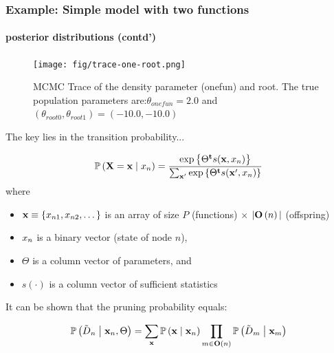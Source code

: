 \documentclass[aspectratio=169,9pt,handout]{beamer}
\begin{document}
\begin{frame}[c]
	\frametitle{Example: Simple model with two functions}
	\framesubtitle{posterior distributions (contd')}
	\begin{figure}
		\texttt{[image: fig/trace-one-root.png]}
		\caption{MCMC Trace of the density parameter (onefun) and root. The true population parameters are:\linebreak $\theta_{onefun} = 2.0$ and $(\theta_{root0}, \theta_{root1}) = (-10.0, -10.0)$}
	\end{figure}
\end{frame}


\begin{frame}
	
	\large The key lies in the \alert{transition probability}...\normalsize
	
	\begin{equation}
		\Prcond{\Ann=\mathbf{x}}{\ann{n}} = \frac{\exp{\t{\Theta} s(\mathbf{x},\ann{n})}}{\sum_{\mathbf{x}'}\exp{\t{\Theta} s(\mathbf{x}', \ann{n})}}
	\end{equation}
	where
	
	\begin{itemize}
	\item $\mathbf{x} \equiv \{x_{n1}{}, x_{n2}{},\dots\}$ is an array of size $P$ (functions) $\times$ $|\mathbf{O}\left(n\right)|$ (offspring)
	\item $x_{n}{}$ is a binary vector (state of node $n$),
	\item $\Theta$ is a column vector of parameters, and
	\item $s(\cdot)$ is a column vector of sufficient statistics 
	\end{itemize}

It can be shown that the \alert{pruning} probability equals:
	
\begin{equation}
	\Prcond{\aphyloObs_n}{\mathbf{x}_{n}, \Theta} = %
	\sum_{\mathbf{x}}\Prcond{\mathbf{x}}{\mathbf{x}_{n}}\prod_{m \in \offspring{n}}\Prcond{\aphyloObs_{m}}{\mathbf{x}_{m}}\label{eq:depfun-depsibs}
\end{equation}
\end{frame}
\end{document}
